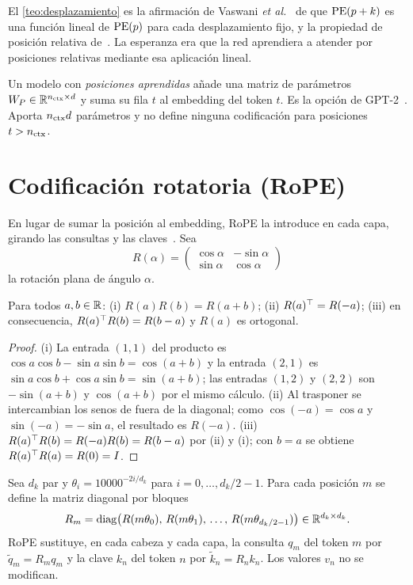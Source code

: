 El \cref{teo:desplazamiento} es la afirmación de Vaswani \emph{et al.}~\cite[§3.5]{vaswani} de que $\operatorname{PE}(p+k)$ es una función lineal de $\operatorname{PE}(p)$ para cada desplazamiento fijo, y la propiedad de posición relativa de~\cite[§11.6.3.2]{d2l}. La esperanza era que la red aprendiera a atender por posiciones relativas mediante esa aplicación lineal.

\begin{definicion}
Un modelo con \emph{posiciones aprendidas} añade una matriz de parámetros $W_P\in\mathbb{R}^{n_{\mathrm{ctx}}\times d}$ y suma su fila $t$ al embedding del token $t$. Es la opción de GPT-2~\cite{gpt2}. Aporta $n_{\mathrm{ctx}} d$ parámetros y no define ninguna codificación para posiciones $t>n_{\mathrm{ctx}}$.
\end{definicion}

\section{Codificación rotatoria (RoPE)}

En lugar de sumar la posición al embedding, RoPE la introduce en cada capa, girando las consultas y las claves~\cite{roformer}. Sea
\[
R(\alpha)=\begin{pmatrix}\cos\alpha&-\sin\alpha\\ \sin\alpha&\cos\alpha\end{pmatrix}
\]
la rotación plana de ángulo $\alpha$.

\begin{lema}\label{lem:rotaciones}
Para todos $a,b\in\mathbb{R}$: (i) $R(a)R(b)=R(a+b)$; (ii) $R(a)^{\top}=R(-a)$; (iii) en consecuencia, $R(a)^{\top} R(b)=R(b-a)$ y $R(a)$ es ortogonal.
\end{lema}

\begin{proof}
(i) La entrada $(1,1)$ del producto es $\cos a\cos b-\sin a\sin b=\cos(a+b)$ y la entrada $(2,1)$ es $\sin a\cos b+\cos a\sin b=\sin(a+b)$; las entradas $(1,2)$ y $(2,2)$ son $-\sin(a+b)$ y $\cos(a+b)$ por el mismo cálculo. (ii) Al trasponer se intercambian los senos de fuera de la diagonal; como $\cos(-a)=\cos a$ y $\sin(-a)=-\sin a$, el resultado es $R(-a)$. (iii) $R(a)^{\top} R(b)=R(-a)R(b)=R(b-a)$ por (ii) y (i); con $b=a$ se obtiene $R(a)^{\top} R(a)=R(0)=I$.
\end{proof}

\begin{definicion}[RoPE]\label{def:rope}
Sea $d_k$ par y $\theta_i=10000^{-2i/d_k}$ para $i=0,\dots,d_k/2-1$. Para cada posición $m$ se define la matriz diagonal por bloques
\[
R_m=\operatorname{diag}\bigl(R(m\theta_0),\,R(m\theta_1),\,\dots,\,R(m\theta_{d_k/2-1})\bigr)\in\mathbb{R}^{d_k\times d_k}.
\]
RoPE sustituye, en cada cabeza y cada capa, la consulta $q_m$ del token $m$ por $\tilde q_m=R_mq_m$ y la clave $k_n$ del token $n$ por $\tilde k_n=R_nk_n$. Los valores $v_n$ no se modifican.
\end{definicion}

